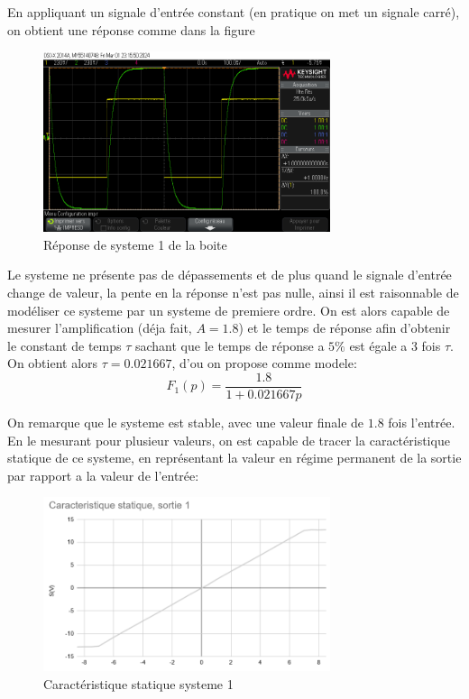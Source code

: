 \documentclass[12pt, a4paper]{report}
\begin{document}
En appliquant un signale d'entrée constant (en pratique on met un signale carré), on obtient une réponse
comme dans la figure 

\begin{figure}[h]
    \centering
    \includegraphics[width=0.75\textwidth]{mesureA1.png}
    \caption{Réponse de systeme 1 de la boite}
    \label{fig:reponse1ersys}
\end{figure}

Le systeme ne présente pas de dépassements et de plus quand le signale d'entrée change de valeur, la pente
en la réponse n'est pas nulle, ainsi il est raisonnable de modéliser ce systeme par un systeme de premiere ordre.
On est alors capable de mesurer l'amplification (déja fait, $A = 1.8$) et le temps de réponse afin d'obtenir le constant de temps $\tau$
sachant que le temps de réponse a $5\%$ est égale a 3 fois $\tau$. On obtient alors $\tau = 0.021667$, d'ou on propose comme modele:
\[
    F_1(p) = \frac{1.8}{1 + 0.021667p}  
\]

On remarque que le systeme est stable, avec une valeur finale de $1.8$ fois l'entrée. En le mesurant pour plusieur valeurs,
on est capable de tracer la caractéristique statique de ce systeme, en représentant la valeur en régime permanent de la sortie par rapport 
a la valeur de l'entrée:

\begin{figure}[H]
    \centering
    \includegraphics[width=0.75\textwidth]{caracteristiquestatiquesys1.png}
    \caption{Caractéristique statique systeme 1}
    \label{fig:carstattiquesys1}
\end{figure}
\end{document}
